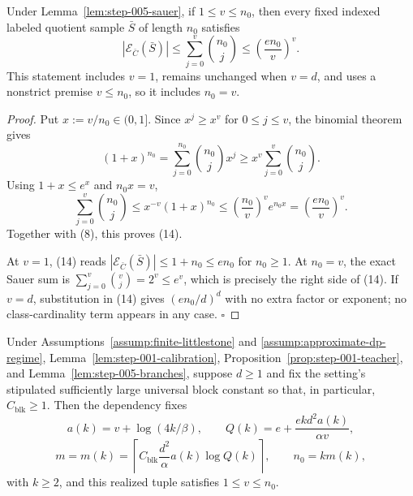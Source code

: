 \begin{lemma}\label{lem:step-005-binomial}
Under Lemma~\ref{lem:step-005-sauer}, if \(1\le v\le n_0\), then every fixed
indexed labeled quotient sample \(\bar S\) of length \(n_0\) satisfies
\[
|\mathcal E_{\bar C}(\bar S)|
\le \sum_{j=0}^{v}\binom{n_0}{j}
\le \left(\frac{e n_0}{v}\right)^v.
\tag{14}
\]
This statement includes \(v=1\), remains unchanged when \(v=d\), and uses a
nonstrict premise \(v\le n_0\), so it includes \(n_0=v\).


\end{lemma}

\begin{proof}
Put \(x:=v/n_0\in(0,1]\).  Since \(x^j\ge x^v\) for
\(0\le j\le v\), the binomial theorem gives
\[
(1+x)^{n_0}
=\sum_{j=0}^{n_0}\binom{n_0}{j}x^j
\ge x^v\sum_{j=0}^{v}\binom{n_0}{j}.
\tag{15}
\]
Using \(1+x\le e^x\) and \(n_0x=v\),
\[
\sum_{j=0}^{v}\binom{n_0}{j}
\le x^{-v}(1+x)^{n_0}
\le \left(\frac{n_0}{v}\right)^v e^{n_0x}
=\left(\frac{e n_0}{v}\right)^v.
\tag{16}
\]
Together with (8), this proves (14).

At \(v=1\), (14) reads
\(|\mathcal E_{\bar C}(\bar S)|\le1+n_0\le e n_0\) for \(n_0\ge1\).
At \(n_0=v\), the exact Sauer sum is
\(\sum_{j=0}^v\binom{v}{j}=2^v\le e^v\), which is precisely the right side
of (14).  If \(v=d\), substitution in (14) gives
\((e n_0/d)^d\) with no extra factor or exponent; no class-cardinality term
appears in any case. \(\square\)


\end{proof}

\begin{proposition}\label{prop:step-005-positive-range}
Under Assumptions~\ref{assump:finite-littlestone} and
\ref{assump:approximate-dp-regime}, Lemma~\ref{lem:step-001-calibration}, Proposition~\ref{prop:step-001-teacher}, and
Lemma~\ref{lem:step-005-branches}, suppose \(d\ge1\) and fix the setting's
stipulated sufficiently large universal block constant so that, in
particular, \(C_{\mathrm{blk}}\ge1\).  Then the  dependency fixes
\[
a(k)=v+\log(4k/\beta),\qquad
Q(k)=e+\frac{e k d^2a(k)}{\alpha v},
\]
\[
m=m(k)=\left\lceil C_{\mathrm{blk}}
\frac{d^2}{\alpha}a(k)\log Q(k)\right\rceil,
\qquad n_0=km(k),
\]
with \(k\ge2\), and this realized tuple satisfies \(1\le v\le n_0\).


\end{proposition}


